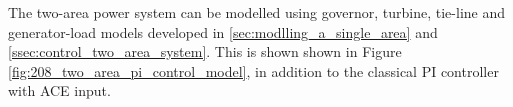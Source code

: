 The two-area power system can be modelled using governor, turbine, tie-line and generator-load models developed in \textsection \ref{sec:modlling_a_single_area} and \textsection \ref{ssec:control_two_area_system}. This is shown shown in Figure \ref{fig:208_two_area_pi_control_model}, in addition to the classical PI controller with ACE input.

\clearpage

\begin{sidewaysfigure}[ht]
\centering
\resizebox{22cm}{!}{}
\caption[Two area power system with PI feedback control]{A classical feedback control approach to a two area power system \cite{Kundur1994}.}
\label{fig:208_two_area_pi_control_model}
\end{sidewaysfigure}

\clearpage